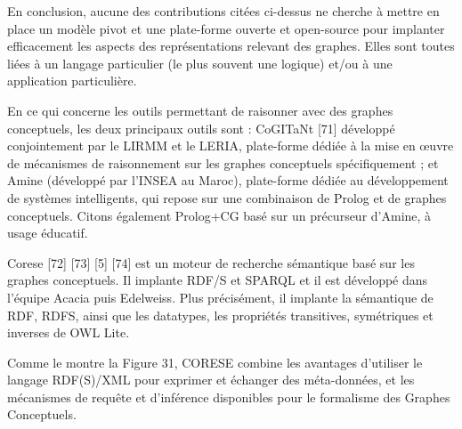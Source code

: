 En conclusion, aucune des contributions citées ci-dessus ne cherche à mettre en place un modèle pivot et une plate-forme ouverte et open-source pour implanter efficacement les aspects des représentations relevant des graphes. Elles sont toutes liées à un langage particulier (le plus souvent une logique) et/ou à une application particulière.

En ce qui concerne les outils permettant de raisonner avec des graphes conceptuels, les deux principaux outils sont : CoGITaNt [71] développé conjointement par le LIRMM et le LERIA, plate-forme dédiée à la mise en œuvre de mécanismes de raisonnement sur les graphes conceptuels spécifiquement ; et Amine (développé par l'INSEA au Maroc), plate-forme dédiée au développement de systèmes intelligents, qui repose sur une combinaison de Prolog et de graphes conceptuels. Citons également Prolog+CG basé sur un précurseur d'Amine, à usage éducatif.

Corese [72] [73] [5] [74] est un moteur de recherche sémantique basé sur les graphes conceptuels. Il implante RDF/S et SPARQL et il est développé dans l’équipe Acacia puis Edelweiss. Plus précisément, il implante la sémantique de RDF, RDFS, ainsi que les datatypes, les propriétés transitives, symétriques et inverses de OWL Lite.

Comme le montre la Figure 31, CORESE combine les avantages d'utiliser le langage RDF(S)/XML pour exprimer et échanger des méta-données, et les mécanismes de requête et d'inférence disponibles pour le formalisme des Graphes Conceptuels.




